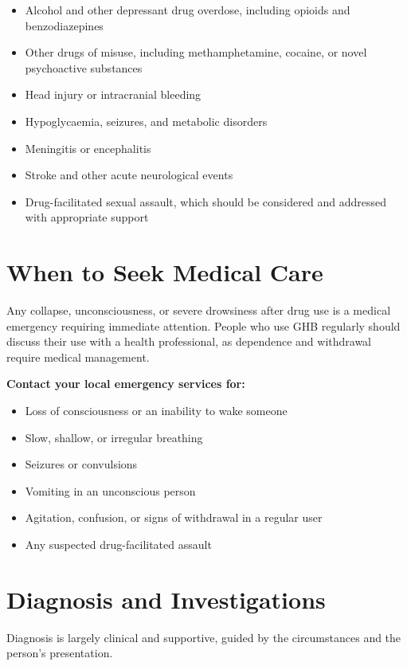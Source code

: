 \begin{itemize}
    \item Alcohol and other depressant drug overdose, including opioids and benzodiazepines
    \item Other drugs of misuse, including methamphetamine, cocaine, or novel psychoactive substances
    \item Head injury or intracranial bleeding
    \item Hypoglycaemia, seizures, and metabolic disorders
    \item Meningitis or encephalitis
    \item Stroke and other acute neurological events
    \item Drug-facilitated sexual assault, which should be considered and addressed with appropriate support
\end{itemize}

\section*{When to Seek Medical Care}
Any collapse, unconsciousness, or severe drowsiness after drug use is a medical emergency requiring immediate attention. People who use GHB regularly should discuss their use with a health professional, as dependence and withdrawal require medical management.

\textbf{Contact your local emergency services for:}
\begin{itemize}
    \item Loss of consciousness or an inability to wake someone
    \item Slow, shallow, or irregular breathing
    \item Seizures or convulsions
    \item Vomiting in an unconscious person
    \item Agitation, confusion, or signs of withdrawal in a regular user
    \item Any suspected drug-facilitated assault
\end{itemize}

\section*{Diagnosis and Investigations}
Diagnosis is largely clinical and supportive, guided by the circumstances and the person's presentation.

